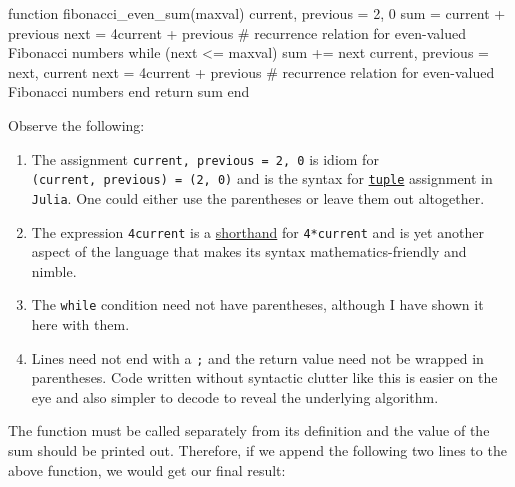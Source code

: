 \documentclass[
  a4paper,
]{article}
\newenvironment{Shaded}{\begin{snugshade}}{\end{snugshade}}
\newcommand{\CommentTok}[1]{\textcolor[rgb]{0.50,0.62,0.50}{#1}}
\newcommand{\ControlFlowTok}[1]{\textcolor[rgb]{0.94,0.87,0.69}{#1}}
\newcommand{\FloatTok}[1]{\textcolor[rgb]{0.75,0.75,0.82}{#1}}
\newcommand{\FunctionTok}[1]{\textcolor[rgb]{0.94,0.94,0.56}{#1}}
\newcommand{\KeywordTok}[1]{\textcolor[rgb]{0.94,0.87,0.69}{#1}}
\newcommand{\NormalTok}[1]{\textcolor[rgb]{0.80,0.80,0.80}{#1}}
\newcommand{\OperatorTok}[1]{\textcolor[rgb]{0.94,0.94,0.82}{#1}}
\begin{document}
\begin{Shaded}
\begin{Highlighting}[]
\KeywordTok{function} \FunctionTok{fibonacci\_even\_sum}\NormalTok{(maxval)}
\NormalTok{  current, previous }\OperatorTok{=} \FloatTok{2}\NormalTok{, }\FloatTok{0}
\NormalTok{  sum }\OperatorTok{=}\NormalTok{ current }\OperatorTok{+}\NormalTok{ previous}
\NormalTok{  next }\OperatorTok{=} \FloatTok{4}\NormalTok{current }\OperatorTok{+}\NormalTok{ previous }\CommentTok{\# recurrence relation for even{-}valued Fibonacci numbers}
  \ControlFlowTok{while}\NormalTok{ (next }\OperatorTok{\textless{}=}\NormalTok{ maxval)}
\NormalTok{    sum }\OperatorTok{+=}\NormalTok{ next}
\NormalTok{    current, previous }\OperatorTok{=}\NormalTok{ next, current}
\NormalTok{    next }\OperatorTok{=} \FloatTok{4}\NormalTok{current }\OperatorTok{+}\NormalTok{ previous }\CommentTok{\# recurrence relation for even{-}valued Fibonacci numbers}
  \ControlFlowTok{end}
  \ControlFlowTok{return}\NormalTok{ sum}
\KeywordTok{end}
\end{Highlighting}
\end{Shaded}

Observe the following:

\begin{enumerate}
\item
  The assignment \texttt{current,\ previous\ =\ 2,\ 0} is idiom for
  \texttt{(current,\ previous)\ =\ (2,\ 0)} and is the syntax for
  \href{https://discourse.julialang.org/t/correct-way-to-do-multiple-variable-assignments/30242}{\texttt{tuple}}
  assignment in \texttt{Julia}. One could either use the parentheses or
  leave them out altogether.
\item
  The expression \texttt{4current} is a
  \href{https://docs.julialang.org/en/v1/manual/integers-and-floating-point-numbers/\#man-numeric-literal-coefficients}{shorthand}
  for \texttt{4*current} and is yet another aspect of the language that
  makes its syntax mathematics-friendly and nimble.
\item
  The \texttt{while} condition need not have parentheses, although I
  have shown it here with them.
\item
  Lines need not end with a \texttt{;} and the return value need not be
  wrapped in parentheses. Code written without syntactic clutter like
  this is easier on the eye and also simpler to decode to reveal the
  underlying algorithm.
\end{enumerate}

The function must be called separately from its definition and the value
of the sum should be printed out. Therefore, if we append the following
two lines to the above function, we would get our final result:
\end{document}
